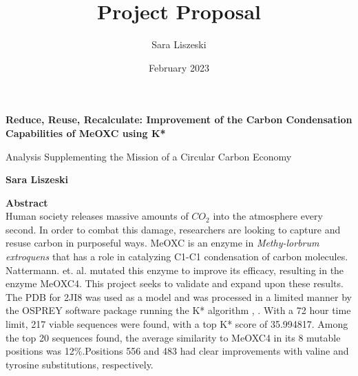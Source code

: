 \documentclass[12pt]{extarticle}
\title{Project Proposal}
\author{\small Sara Liszeski}
\date{\small February 2023}
\begin{document}
\thispagestyle{plain}
\begin{center}
    \Large
    \textbf{Reduce, Reuse, Recalculate: Improvement of the Carbon Condensation Capabilities of MeOXC using K* }
        
    \vspace{0.4cm}
    \large
    Analysis Supplementing the Mission of a Circular Carbon Economy
        
    \vspace{0.4cm}
    \textbf{Sara Liszeski}
       
    \vspace{0.9cm}
    \small
    \textbf{Abstract}\\
    Human society releases massive amounts of $CO_2$ into the atmosphere every second. In order to combat this damage, researchers are looking to capture and resuse carbon in purposeful ways. MeOXC is an enzyme in \textit{Methy-lorbrum extroquens} that has a role in catalyzing C1-C1 condensation of carbon molecules. Nattermann. et. al. mutated this enzyme to improve its efficacy, resulting in the enzyme MeOXC4. This project seeks to validate and expand upon these results. The PDB for 2JI8 was used as a model and was processed in a limited manner by the OSPREY software package running the K* algorithm \cite{Hallen}, \cite{Lilien}. With a 72 hour time limit, 217 viable sequences were found, with a top K* score of 35.994817. Among the top 20 sequences found, the average similarity to MeOXC4 in its 8 mutable positions was 12\%.Positions 556 and 483 had clear improvements with valine and tyrosine substitutions, respectively.
\end{center}
\end{document}
